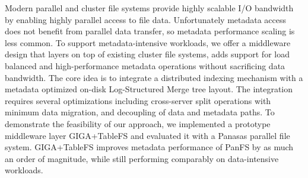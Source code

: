 
Modern parallel and cluster file systems provide highly scalable I/O bandwidth
by enabling highly parallel access to file data.
Unfortunately metadata access does not benefit from parallel data transfer,
so metadata performance scaling is less common.
To support metadata-intensive workloads,
we offer a middleware design that layers on top of existing cluster
file systems, adds support for load balanced and
high-performance metadata operations without sacrificing data bandwidth.
The core idea is to integrate a distributed indexing mechanism
with a metadata optimized on-disk Log-Structured Merge tree layout.
The integration requires several optimizations including cross-server split
operations with minimum data migration, and decoupling of
data and metadata paths. To demonstrate the feasibility of our approach,
we implemented a prototype middleware layer GIGA+TableFS
and evaluated it with a Panasas parallel file system. GIGA+TableFS improves
metadata performance of PanFS by as much an order of magnitude,
while still performing comparably on data-intensive workloads.
